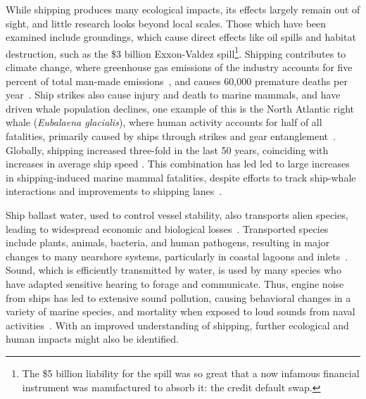 While shipping produces many ecological impacts, its effects largely remain out of sight, and little research looks beyond local scales. Those which have been examined include groundings, which cause direct effects like oil spills and habitat destruction, such as the \$3 billion Exxon-Valdez spill\footnote{The \$5 billion liability for the spill was so great that a now infamous financial instrument was manufactured to absorb it: the credit default swap.}.  Shipping contributes to climate change, where greenhouse gas emissions of the industry accounts for five percent of total man-made emissions~\citep{Eyring2009}, and causes 60,000 premature deaths per year~\citep{Corbett2007}.  Ship strikes also cause injury and death to marine mammals, and have driven whale population declines, one example of this is the North Atlantic right whale (\textit{Eubalaena glacialis}), where human activity accounts for half of all fatalities, primarily caused by ships through strikes and gear entanglement~\citep{Moore2007}. Globally, shipping increased three-fold in the last 50 years, coinciding with increases in average ship speed \citep{Vanderlaan2009}. This combination has led led to large increases in shipping-induced marine mammal fatalities, despite efforts to track ship-whale interactions \citep{jensen2004large} and improvements to shipping lanes~\citep{Lagueux2011,Mckenna2012a}.

Ship ballast water, used to control vessel stability, also transports alien species, leading to widespread economic and biological losses~\citep{Ruiz2000,Rodrigue2009}. Transported species include plants, animals, bacteria, and human pathogens, resulting in major changes to many nearshore systems, particularly in coastal lagoons and inlets~\citep{leppakoski2002baltic}.  Sound, which is efficiently transmitted by water, is used by many species who have adapted sensitive hearing to forage and communicate. Thus, engine noise from ships has led to extensive sound pollution, causing behavioral changes in a variety of marine species, and mortality when exposed to loud sounds from naval activities~\citep{Hatch2009}. With an improved understanding of shipping, further ecological and human impacts might also be identified.


